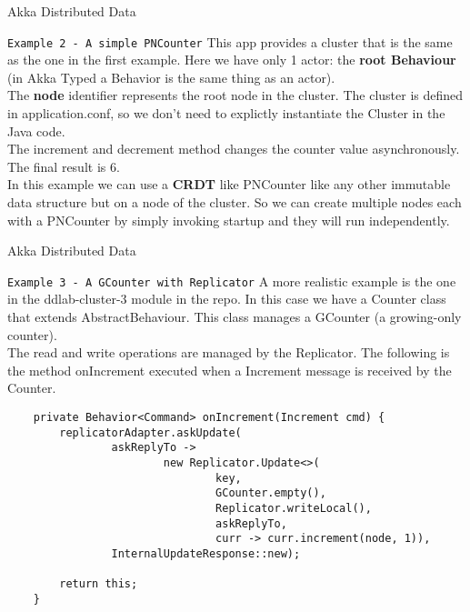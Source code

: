 \documentclass[presentation,apice]{beamer}\mode<presentation>{\usetheme{AMSBolognaFC}}
\begin{document}
\begin{frame}[c,fragile]{Akka Distributed Data}
\begin{block}{\texttt{Example 2 - A simple PNCounter}}
This app provides a cluster that is the same as the one in the first example.
Here we have only 1 actor: the \textbf{root Behaviour} (in Akka Typed a Behavior is the same thing as an actor). \\
The \textbf{node} identifier represents the root node in the cluster.
The cluster is defined in application.conf, so we don't need to explictly instantiate the Cluster in the Java code. \\
The increment and decrement method changes the counter value asynchronously. The final result is 6.\\
In this example we can use a \textbf{CRDT} like PNCounter like any other immutable data structure but on a node of the cluster. So we can create multiple nodes each with a PNCounter by simply invoking startup and they will run independently.
\end{block}
%
\end{frame}

\begin{frame}[c,fragile]{Akka Distributed Data}
\begin{block}{\texttt{Example 3 - A GCounter with Replicator}}
A more realistic example is the one in the ddlab-cluster-3 module in the repo.
In this case we have a Counter class that extends AbstractBehaviour.
This class manages a GCounter (a growing-only counter).\\
The read and write operations are managed by the Replicator.
The following is the method onIncrement executed when a Increment message is received by the Counter.
\begin{lstlisting}
    private Behavior<Command> onIncrement(Increment cmd) {
        replicatorAdapter.askUpdate(
                askReplyTo ->
                        new Replicator.Update<>(
                                key,
                                GCounter.empty(),
                                Replicator.writeLocal(),
                                askReplyTo,
                                curr -> curr.increment(node, 1)),
                InternalUpdateResponse::new);

        return this;
    }    
\end{lstlisting}
    
\end{block}
%
\end{frame}
\end{document}
